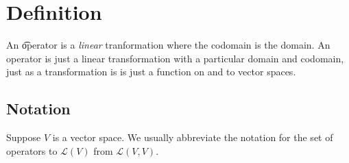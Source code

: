 
\section*{Definition}

An \t{operator} is a \textit{linear} tranformation where the codomain is the domain.
An operator is just a linear transformation with a particular domain and codomain, just as a transformation is is just a function on and to vector spaces.

\subsection*{Notation}

Suppose $V$ is a vector space.
We usually abbreviate the notation for the set of operators to $\mathcal{L} (V)$ from $\mathcal{L} (V, V)$.

\blankpage